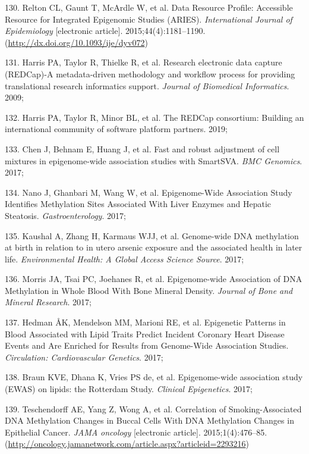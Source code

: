 \documentclass[11pt,oneside]{bristolthesis}
\newenvironment{cslreferences}%
  {}%
  {\par}
\begin{document}
\begin{cslreferences}
\leavevmode\hypertarget{ref-Relton2015-aries}{}%
130. Relton CL, Gaunt T, McArdle W, et al. Data Resource Profile: Accessible Resource for Integrated Epigenomic Studies (ARIES). \emph{International Journal of Epidemiology} {[}electronic article{]}. 2015;44(4):1181--1190. (\url{http://dx.doi.org/10.1093/ije/dyv072})

\leavevmode\hypertarget{ref-Harris2009}{}%
131. Harris PA, Taylor R, Thielke R, et al. Research electronic data capture (REDCap)-A metadata-driven methodology and workflow process for providing translational research informatics support. \emph{Journal of Biomedical Informatics}. 2009;

\leavevmode\hypertarget{ref-Harris2019}{}%
132. Harris PA, Taylor R, Minor BL, et al. The REDCap consortium: Building an international community of software platform partners. 2019;

\leavevmode\hypertarget{ref-Chen2017}{}%
133. Chen J, Behnam E, Huang J, et al. Fast and robust adjustment of cell mixtures in epigenome-wide association studies with SmartSVA. \emph{BMC Genomics}. 2017;

\leavevmode\hypertarget{ref-Nano2017}{}%
134. Nano J, Ghanbari M, Wang W, et al. Epigenome-Wide Association Study Identifies Methylation Sites Associated With Liver Enzymes and Hepatic Steatosis. \emph{Gastroenterology}. 2017;

\leavevmode\hypertarget{ref-Kaushal2017}{}%
135. Kaushal A, Zhang H, Karmaus WJJ, et al. Genome-wide DNA methylation at birth in relation to in utero arsenic exposure and the associated health in later life. \emph{Environmental Health: A Global Access Science Source}. 2017;

\leavevmode\hypertarget{ref-Morris2017}{}%
136. Morris JA, Tsai PC, Joehanes R, et al. Epigenome-wide Association of DNA Methylation in Whole Blood With Bone Mineral Density. \emph{Journal of Bone and Mineral Research}. 2017;

\leavevmode\hypertarget{ref-Hedman2017}{}%
137. Hedman ÅK, Mendelson MM, Marioni RE, et al. Epigenetic Patterns in Blood Associated with Lipid Traits Predict Incident Coronary Heart Disease Events and Are Enriched for Results from Genome-Wide Association Studies. \emph{Circulation: Cardiovascular Genetics}. 2017;

\leavevmode\hypertarget{ref-Braun2017}{}%
138. Braun KVE, Dhana K, Vries PS de, et al. Epigenome-wide association study (EWAS) on lipids: the Rotterdam Study. \emph{Clinical Epigenetics}. 2017;

\leavevmode\hypertarget{ref-Teschendorff2015}{}%
139. Teschendorff AE, Yang Z, Wong A, et al. Correlation of Smoking-Associated DNA Methylation Changes in Buccal Cells With DNA Methylation Changes in Epithelial Cancer. \emph{JAMA oncology} {[}electronic article{]}. 2015;1(4):476--85. (\url{http://oncology.jamanetwork.com/article.aspx?articleid=2293216})


\end{cslreferences}
\end{document}
